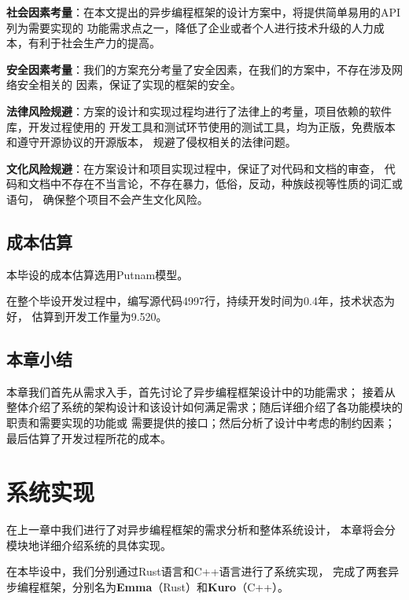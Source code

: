 \documentclass[supercite]{HustGraduPaper}
\theoremstyle{definition}
\begin{document}
\textbf{社会因素考量}：在本文提出的异步编程框架的设计方案中，将提供简单易用的API列为需要实现的
功能需求点之一，降低了企业或者个人进行技术升级的人力成本，有利于社会生产力的提高。\par

\textbf{安全因素考量}：我们的方案充分考量了安全因素，在我们的方案中，不存在涉及网络安全相关的
因素，保证了实现的框架的安全。\par

\textbf{法律风险规避}：方案的设计和实现过程均进行了法律上的考量，项目依赖的软件库，开发过程使用的
开发工具和测试环节使用的测试工具，均为正版，免费版本和遵守开源协议的开源版本，
规避了侵权相关的法律问题。\par

\textbf{文化风险规避}：在方案设计和项目实现过程中，保证了对代码和文档的审查，
代码和文档中不存在不当言论，不存在暴力，低俗，反动，种族歧视等性质的词汇或语句，
确保整个项目不会产生文化风险。\par

\subsection{成本估算}

本毕设的成本估算选用Putnam模型。\par

在整个毕设开发过程中，编写源代码4997行，持续开发时间为0.4年，技术状态为好，
估算到开发工作量为9.520。\par

\subsection{本章小结}

本章我们首先从需求入手，首先讨论了异步编程框架设计中的功能需求；
接着从整体介绍了系统的架构设计和该设计如何满足需求；随后详细介绍了各功能模块的职责和需要实现的功能或
需要提供的接口；然后分析了设计中考虑的制约因素；最后估算了开发过程所花的成本。\par

\section{系统实现}

在上一章中我们进行了对异步编程框架的需求分析和整体系统设计，
本章将会分模块地详细介绍系统的具体实现。\par

在本毕设中，我们分别通过Rust语言和C++语言进行了系统实现，
完成了两套异步编程框架，分别名为\textbf{Emma}（Rust）和\textbf{Kuro}（C++）。\par
\end{document}
